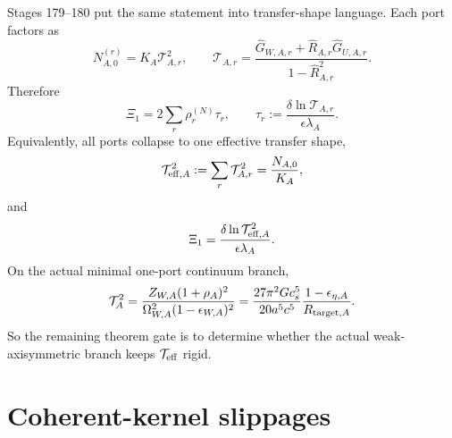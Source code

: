 Stages 179--180 put the same statement into transfer-shape language.  Each port factors as
\begin{equation}
\label{eq:app-part05-port-transfer-shape}
N_{A,0}^{(r)}=K_A\mathcal T_{A,r}^2,
\qquad
\mathcal T_{A,r}
=
\frac{\widehat G_{W,A,r}+\widehat R_{A,r}\widehat G_{U,A,r}}{1-\widehat R_{A,r}^2}.
\end{equation}
Therefore
\begin{equation}
\label{eq:app-part05-Xi1-transfer-shape-sum}
\Xi_1=2\sum_r\rho_r^{(N)}\tau_r,
\qquad
\tau_r:=\frac{\delta\ln\mathcal T_{A,r}}{\epsilon\lambda_A}.
\end{equation}
Equivalently, all ports collapse to one effective transfer shape,
\begin{equation}
\label{eq:app-part05-Teff-def}
\mathcal T_{{\rm eff},A}^2
:=
\sum_r\mathcal T_{A,r}^2
=
\frac{N_{A,0}}{K_A},
\end{equation}
and
\begin{equation}
\label{eq:app-part05-Xi1-Teff}
\Xi_1
=
\frac{\delta\ln\mathcal T_{{\rm eff},A}^2}{\epsilon\lambda_A}.
\end{equation}
On the actual minimal one-port continuum branch,
\begin{equation}
\label{eq:app-part05-T-one-port-continuum}
\mathcal T_A^2
=
\frac{Z_{W,A}(1+\rho_A)^2}{\Omega_{W,A}^2(1-\epsilon_{W,A})^2}
=
\frac{27\pi^2Gc_s^5}{20a^5c^5}
\frac{1-\epsilon_{\eta,A}}{R_{{\rm target},A}}.
\end{equation}
So the remaining theorem gate is to determine whether the actual weak-axisymmetric branch keeps \(\mathcal T_{{\rm eff}}\) rigid.


\section{Coherent-kernel slippages}
\label{sec:app-part05_weak_axisymmetric_orbit:coherent-kernel-slippages}

